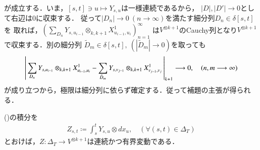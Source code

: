 \begin{prf}
\begin{align}
		\end{align}
		が成立する．いま，$[s,t] \ni u \longmapsto Y_{s,u}$は一様連続であるから，
		$|D|,|D'|\longrightarrow 0$として右辺は0に収束する．
		従って$|D_n| \longrightarrow 0\ (n \longrightarrow \infty)$を満たす細分列$D_n \in \delta[s,t]$を
		取れば，$\left(\sum_{D_n} Y_{s,u_{i-1}} \otimes_{k,k+1} X^1_{u_{i-1},u_i} \right)_{n=1}^{\infty}$
		は$V^{\otimes k+1}$のCauchy列となり$V^{\otimes k+1}$で収束する．別の細分列
		$\tilde{D}_m \in \delta[s,t],\ (|\tilde{D}_m| \longrightarrow 0)$を取っても
		\begin{align}
			\left|\,  \sum_{D_n} Y_{s,u_{i-1}} \otimes_{k,k+1} X^1_{u_{i-1},u_i} - 
				\sum_{\tilde{D}_m} Y_{s,v_{j-1}} \otimes_{k,k+1} X^1_{v_{j-1},v_j}\, \right|_{k+1}
			\longrightarrow 0,
			\quad (n,m \longrightarrow \infty)
		\end{align}
		が成り立つから，極限は細分列に依らず確定する．従って補題の主張が得られる．
		\QED
	\end{prf}
	
	\begin{screen}
		\begin{lem}\label{lem:signature_of_path}
			()の積分を
			\begin{align}
				Z_{s,t} \coloneqq \int_s^t Y_{s,u} \otimes d x_u,
				\quad (\forall (s,t) \in \Delta_T)
				\label{eq:signature_of_path_1}
			\end{align}
			とおけば，$Z:\Delta_T \longrightarrow V^{\otimes k+1}$は連続かつ有界変動である．
		\end{lem}
	\end{screen}
	
